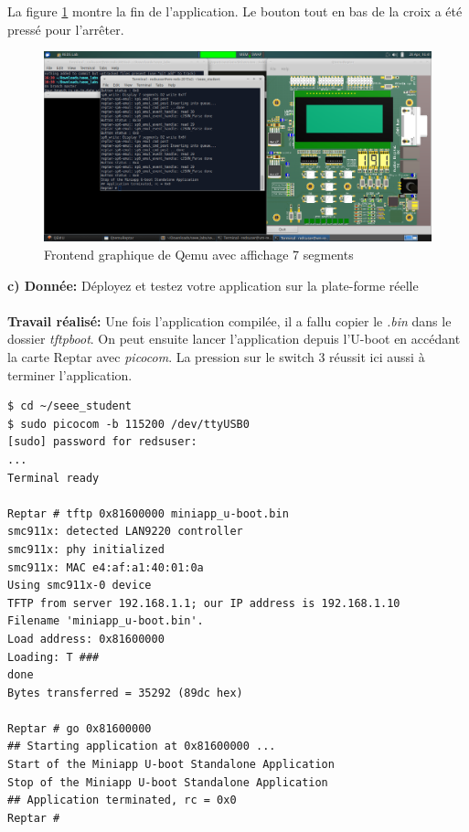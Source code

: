 La figure \ref{emul_miniapp_end} montre la fin de l'application. Le bouton tout en bas de la croix a été pressé pour l'arrêter. 
\begin{figure}[H]
	\begin{center}
		\includegraphics[width=16cm]{img/emul_test_miniapp_end.png}
		\caption{Frontend graphique de Qemu avec affichage 7 segments}
		\label{emul_miniapp_end}
	\end{center}
\end{figure}

\textbf{c) Donnée: }Déployez et testez votre application sur la plate-forme réelle\\\\
\textbf{Travail réalisé: }Une fois l'application compilée, il a fallu copier le \textit{.bin} dans le dossier \textit{tftpboot}. On peut ensuite lancer l'application depuis l'U-boot en accédant la carte Reptar avec \textit{picocom}. La pression sur le switch 3 réussit ici aussi à terminer l'application.
\begin{lstlisting}
$ cd ~/seee_student
$ sudo picocom -b 115200 /dev/ttyUSB0
[sudo] password for redsuser: 
...
Terminal ready

Reptar # tftp 0x81600000 miniapp_u-boot.bin
smc911x: detected LAN9220 controller
smc911x: phy initialized
smc911x: MAC e4:af:a1:40:01:0a
Using smc911x-0 device
TFTP from server 192.168.1.1; our IP address is 192.168.1.10
Filename 'miniapp_u-boot.bin'.
Load address: 0x81600000
Loading: T ###
done
Bytes transferred = 35292 (89dc hex)

Reptar # go 0x81600000
## Starting application at 0x81600000 ...
Start of the Miniapp U-boot Standalone Application
Stop of the Miniapp U-boot Standalone Application
## Application terminated, rc = 0x0
Reptar # 
\end{lstlisting}

